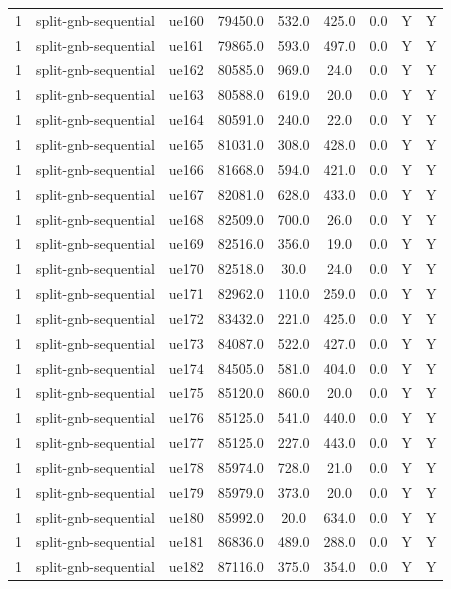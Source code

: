 \begin{table}[ht]
\begin{tabular}{|c|c|c|c|c|c|c|c|c|}
1 & split-gnb-sequential & ue160 & 79450.0 & 532.0 & 425.0 & 0.0 & Y & Y \\
1 & split-gnb-sequential & ue161 & 79865.0 & 593.0 & 497.0 & 0.0 & Y & Y \\
1 & split-gnb-sequential & ue162 & 80585.0 & 969.0 & 24.0 & 0.0 & Y & Y \\
1 & split-gnb-sequential & ue163 & 80588.0 & 619.0 & 20.0 & 0.0 & Y & Y \\
1 & split-gnb-sequential & ue164 & 80591.0 & 240.0 & 22.0 & 0.0 & Y & Y \\
1 & split-gnb-sequential & ue165 & 81031.0 & 308.0 & 428.0 & 0.0 & Y & Y \\
1 & split-gnb-sequential & ue166 & 81668.0 & 594.0 & 421.0 & 0.0 & Y & Y \\
1 & split-gnb-sequential & ue167 & 82081.0 & 628.0 & 433.0 & 0.0 & Y & Y \\
1 & split-gnb-sequential & ue168 & 82509.0 & 700.0 & 26.0 & 0.0 & Y & Y \\
1 & split-gnb-sequential & ue169 & 82516.0 & 356.0 & 19.0 & 0.0 & Y & Y \\
1 & split-gnb-sequential & ue170 & 82518.0 & 30.0 & 24.0 & 0.0 & Y & Y \\
1 & split-gnb-sequential & ue171 & 82962.0 & 110.0 & 259.0 & 0.0 & Y & Y \\
1 & split-gnb-sequential & ue172 & 83432.0 & 221.0 & 425.0 & 0.0 & Y & Y \\
1 & split-gnb-sequential & ue173 & 84087.0 & 522.0 & 427.0 & 0.0 & Y & Y \\
1 & split-gnb-sequential & ue174 & 84505.0 & 581.0 & 404.0 & 0.0 & Y & Y \\
1 & split-gnb-sequential & ue175 & 85120.0 & 860.0 & 20.0 & 0.0 & Y & Y \\
1 & split-gnb-sequential & ue176 & 85125.0 & 541.0 & 440.0 & 0.0 & Y & Y \\
1 & split-gnb-sequential & ue177 & 85125.0 & 227.0 & 443.0 & 0.0 & Y & Y \\
1 & split-gnb-sequential & ue178 & 85974.0 & 728.0 & 21.0 & 0.0 & Y & Y \\
1 & split-gnb-sequential & ue179 & 85979.0 & 373.0 & 20.0 & 0.0 & Y & Y \\
1 & split-gnb-sequential & ue180 & 85992.0 & 20.0 & 634.0 & 0.0 & Y & Y \\
1 & split-gnb-sequential & ue181 & 86836.0 & 489.0 & 288.0 & 0.0 & Y & Y \\
1 & split-gnb-sequential & ue182 & 87116.0 & 375.0 & 354.0 & 0.0 & Y & Y \\

\end{tabular}
\end{table}
